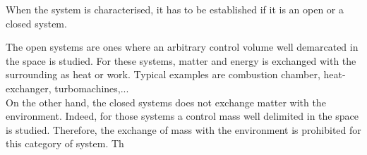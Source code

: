 When the system is characterised, it has to be established if it is an open or a closed system.

The open systems are ones where an arbitrary control volume well demarcated in the space is studied. For these systems, matter and energy is exchanged with the surrounding as heat or work. Typical examples are combustion chamber, heat-exchanger, turbomachines,...\\

On the other hand, the closed systems does not exchange matter with the environment. Indeed, 
for those systems a control mass well delimited in the space is studied. Therefore, the exchange of mass with the environment is prohibited for this category of system. Th

